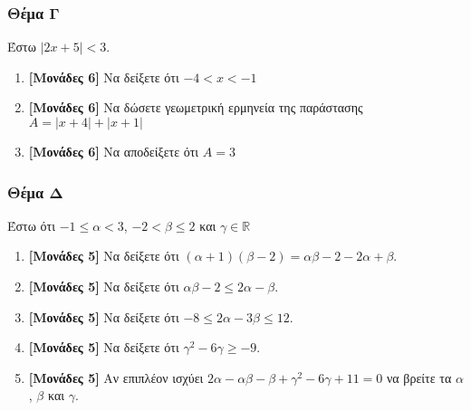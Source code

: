\documentclass[12pt]{article}
\begin{document}
        \section*{Θέμα Γ}
        \noindent
          Έστω $|2x+5|<3$.
          \begin{enumerate}
            \item \textbf{[Μονάδες 6]} Να δείξετε ότι $-4<x<-1$
            \item \textbf{[Μονάδες 6]} Να δώσετε γεωμετρική ερμηνεία της παράστασης $Α=|x+4|+|x+1|$
            \item \textbf{[Μονάδες 6]} Να αποδείξετε ότι $Α=3$
          \end{enumerate}

\section*{Θέμα Δ}
  \noindent
  Έστω ότι $-1\le α<3$, $-2<β\le 2$ και $γ\in\mathbb{R}$
  \begin{enumerate}
    \item \textbf{[Μονάδες 5]} Να δείξετε ότι $(α+1)(β-2)=αβ-2-2α+β$.
    \item \textbf{[Μονάδες 5]} Να δείξετε ότι $αβ-2\le 2α-β$.
    \item \textbf{[Μονάδες 5]} Να δείξετε ότι $-8\le 2α-3β \le 12$.
    \item \textbf{[Μονάδες 5]} Να δείξετε ότι $γ^2-6γ \ge -9$.
    \item \textbf{[Μονάδες 5]} Αν επιπλέον ισχύει $2α-αβ-β+γ^2-6γ+11=0$ να βρείτε τα $α$, $β$ και $γ$.
  \end{enumerate}


\part*{}
\end{document}
